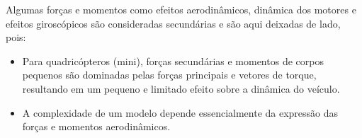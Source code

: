 \documentclass[a4paper, 12pt]{article}
\begin{document}
Algumas forças e momentos como efeitos aerodinâmicos, dinâmica dos motores e efeitos giroscópicos são consideradas secundárias e são aqui deixadas de lado, pois:

\begin{itemize}
\item	Para quadricópteros (mini), forças secundárias e momentos de corpos pequenos são dominadas pelas forças principais e vetores de torque, resultando em um pequeno e limitado efeito sobre a dinâmica do veículo.
\item A complexidade de um modelo depende essencialmente da expressão das forças e momentos aerodinâmicos.
\end{itemize}





\newpage


 

\newpage
\end{document}
